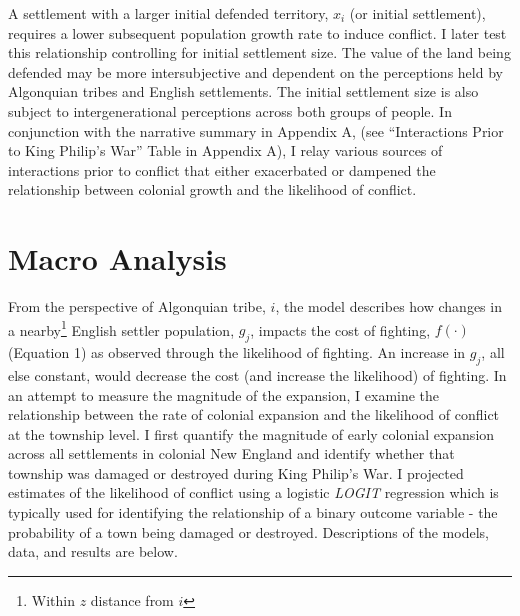 \documentclass[11pt, oneside]{article}
\begin{document}

A settlement with a larger initial defended territory, $x_i$ (or initial settlement), requires a lower subsequent population growth rate to induce conflict. I later test this relationship controlling for initial settlement size. The value of the land being defended may be more intersubjective and dependent on the perceptions held by Algonquian tribes and English settlements. The initial settlement size is also subject to intergenerational perceptions across both groups of people. In conjunction with the narrative summary in Appendix A, (see ``Interactions Prior to King Philip's War'' Table in Appendix A), I relay various sources of interactions prior to conflict that either exacerbated or dampened the relationship between colonial growth and the likelihood of conflict.

\section{Macro Analysis}
From the perspective of Algonquian tribe, $i$, the model describes how changes in a nearby\footnote{Within $z$ distance from $i$} English settler population, $g_j$, impacts the cost of fighting, $f(\cdot)$ (Equation 1) as observed through the likelihood of fighting. An increase in $g_j$, all else constant, would decrease the cost (and increase the likelihood) of fighting.
In an attempt to measure the magnitude of the expansion, I examine the relationship between the rate of colonial expansion and the likelihood of conflict at the township level. I first quantify the magnitude of early colonial expansion across all settlements in colonial New England and identify whether that township was damaged or destroyed during King Philip's War. I projected estimates of the likelihood of conflict using a logistic {\em LOGIT} regression which is typically used for identifying the relationship of a binary outcome variable - the probability of a town being damaged or destroyed. Descriptions of the models, data, and results are below.
\end{document}

